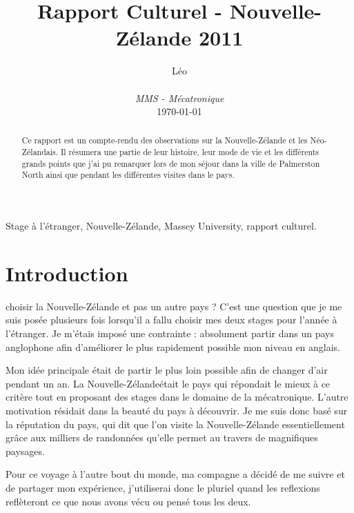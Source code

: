 \documentclass[11pt,journal]{RapportFR}
\newcommand{\Nz}{Nouvelle-Z\'elande\xspace}
\newcommand{\Nzs}{N\'eo-Z\'elandais\xspace}
\newcommand{\PM}{Palmerston North\xspace}
\begin{document}
\title{Rapport Culturel - \Nz 2011}
\author{
  \begin{huge}L\'{e}o \end{huge}\\
  \textit{MMS - M\'ecatronique}\\
  \today
}

\maketitle

\begin{abstract}
Ce rapport est un compte-rendu des observations sur la \Nz et les \Nzs. Il r\'esumera une partie de leur histoire, leur mode de vie et les diff\'erents grands points que j'ai pu remarquer lors de mon s\'ejour dans la ville de \PM ainsi que pendant les diff\'erentes visites dans le pays.
\end{abstract}

\begin{keywords}
Stage \`a l'\'etranger, \Nz, Massey University, rapport culturel.
\end{keywords}


\section{Introduction}
\label{sec:intro}

 choisir la \Nz et pas un autre pays ? 
C'est une question que je me suis pos\'ee plusieurs fois lorsqu'il a fallu choisir mes deux stages pour l'ann\'ee \`a l'\'etranger. 
Je m'étais imposé une contrainte : absolument partir dans un pays anglophone afin d'am\'eliorer le plus rapidement possible mon niveau en anglais.

Mon id\'ee principale \'etait de partir le plus loin possible afin de changer d'air pendant un an. La \Nz \'etait le pays qui r\'epondait le mieux \`a ce crit\`ere tout en proposant des stages dans le domaine de la m\'ecatronique. 
L'autre motivation r\'esidait dans la beaut\'e du pays à découvrir.
Je me suis donc basé sur la réputation du pays, qui dit que l'on visite la \Nz essentiellement grâce aux milliers de randonnées qu'elle permet au travers de magnifiques paysages.

Pour ce voyage \`a l'autre bout du monde, ma compagne a d\'ecid\'e de me suivre et de partager mon exp\'erience, j'utiliserai donc le pluriel quand les reflexions refl\`eteront ce que nous avons v\'ecu ou pens\'e tous les deux.
\end{document}
